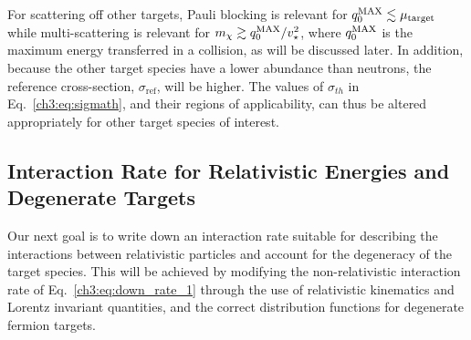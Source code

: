 For scattering off other targets, Pauli blocking is relevant for $q_0^{\rm MAX} \lesssim  \mu_{\rm target}$ 
while multi-scattering is relevant for $m_\chi \gtrsim q_0^{\rm MAX}/v_{\star}^2$, where $q_0^{\rm MAX}$ is the maximum energy transferred in a collision, as will be discussed later.  In addition, because the other target species have a lower abundance than neutrons, the reference cross-section, $\sigma_\mathrm{ref}$, will be higher. The values of $\sigma_{th}$ in Eq.~\ref{ch3:eq:sigmath}, and their regions of applicability, can thus be altered appropriately for other target species of interest.

\subsection{Interaction Rate for Relativistic Energies and Degenerate Targets}
\label{ch3:subsec:int_rate_degen_rel}

Our next goal is to write down an interaction rate suitable for describing the interactions between relativistic particles and account for the degeneracy of the target species. This will be achieved by modifying the non-relativistic interaction rate of Eq.~\ref{ch3:eq:down_rate_1} through the use of relativistic kinematics and Lorentz invariant quantities, and the correct distribution functions for degenerate fermion targets.

